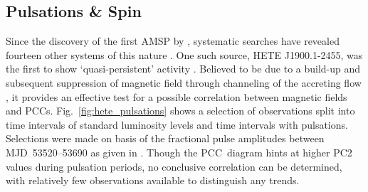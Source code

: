 \subsection{Pulsations \& Spin}
Since the discovery of the first \ac{AMSP} by \citet{wijnands1998millisecond}, systematic searches have revealed fourteen other systems of this nature \citep[see][for a review]{patruno2012accreting}. One such source, HETE J1900.1-2455, was the first to show `quasi-persistent' activity \citep{galloway2006intermittent}. Believed to be due to a build-up and subsequent suppression of magnetic field through channeling of the accreting flow \citep[e.g.][]{cumming2001magnetic}, it provides an effective test for a possible correlation between magnetic fields and \acp{PCC}. Fig.~\ref{fig:hete_pulsations} shows a selection of observations split into time intervals of standard luminosity levels and time intervals with pulsations. Selections were made on basis of the fractional pulse amplitudes between MJD~53520--53690 as given in \citet{galloway2006intermittent}. Though the \ac{PCC}~diagram hints at higher PC2 values during pulsation periods, no conclusive correlation can be determined, with relatively few observations available to distinguish any trends.\\

